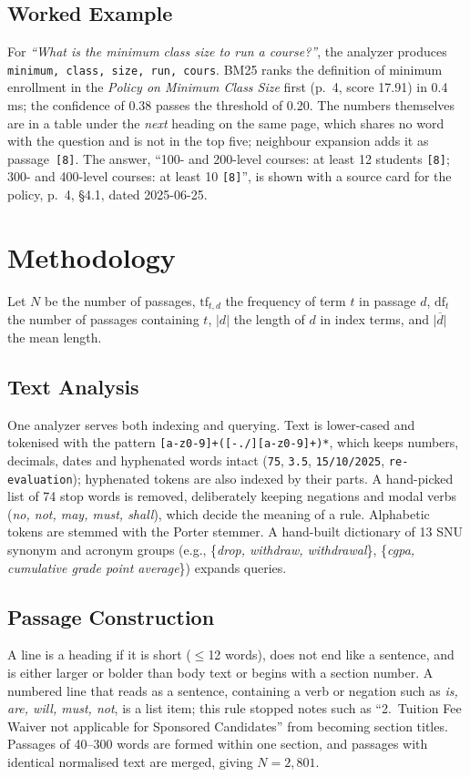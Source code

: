 \documentclass[conference]{IEEEtran}
\newcommand{\code}[1]{\texttt{#1}}
\begin{document}
\subsection{Worked Example}
For \emph{``What is the minimum class size to run a course?''}, the analyzer produces \code{minimum, class, size, run, cours}. BM25 ranks the definition of minimum enrollment in the \emph{Policy on Minimum Class Size} first (p.~4, score 17.91) in 0.4\,ms; the confidence of 0.38 passes the threshold of 0.20. The numbers themselves are in a table under the \emph{next} heading on the same page, which shares no word with the question and is not in the top five; neighbour expansion adds it as passage~\code{[8]}. The answer, ``100- and 200-level courses: at least 12 students \code{[8]}; 300- and 400-level courses: at least 10 \code{[8]}'', is shown with a source card for the policy, p.~4, \S4.1, dated 2025-06-25.

\section{Methodology}\label{sec:method}

Let $N$ be the number of passages, $\mathrm{tf}_{t,d}$ the frequency of term $t$ in passage $d$, $\mathrm{df}_t$ the number of passages containing $t$, $|d|$ the length of $d$ in index terms, and $\overline{|d|}$ the mean length.

\subsection{Text Analysis}
One analyzer serves both indexing and querying. Text is lower-cased and tokenised with the pattern \code{[a-z0-9]+([-./][a-z0-9]+)*}, which keeps numbers, decimals, dates and hyphenated words intact (\code{75}, \code{3.5}, \code{15/10/2025}, \code{re-evaluation}); hyphenated tokens are also indexed by their parts. A hand-picked list of 74 stop words is removed, deliberately keeping negations and modal verbs (\emph{no, not, may, must, shall}), which decide the meaning of a rule. Alphabetic tokens are stemmed with the Porter stemmer. A hand-built dictionary of 13 SNU synonym and acronym groups (e.g., \{\emph{drop, withdraw, withdrawal}\}, \{\emph{cgpa, cumulative grade point average}\}) expands queries.

\subsection{Passage Construction}
A line is a heading if it is short ($\leq$12 words), does not end like a sentence, and is either larger or bolder than body text or begins with a section number. A numbered line that reads as a sentence, containing a verb or negation such as \emph{is, are, will, must, not}, is a list item; this rule stopped notes such as ``2.~Tuition Fee Waiver not applicable for Sponsored Candidates'' from becoming section titles. Passages of 40--300 words are formed within one section, and passages with identical normalised text are merged, giving $N=2{,}801$.
\end{document}
